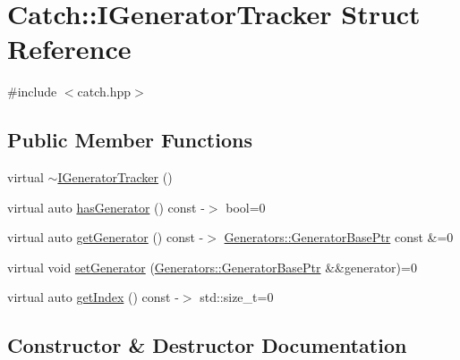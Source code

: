 \hypertarget{struct_catch_1_1_i_generator_tracker}{}\section{Catch\+:\+:I\+Generator\+Tracker Struct Reference}
\label{struct_catch_1_1_i_generator_tracker}


{\ttfamily \#include $<$catch.\+hpp$>$}

\subsection*{Public Member Functions}
\begin{DoxyCompactItemize}
\item 
virtual \mbox{\hyperlink{struct_catch_1_1_i_generator_tracker_a20b3c82baa68f821c180d6dac1234eb1}{$\sim$\+I\+Generator\+Tracker}} ()
\item 
virtual auto \mbox{\hyperlink{struct_catch_1_1_i_generator_tracker_ae88084f9af27c8b9a5d5775b9c148498}{has\+Generator}} () const -\/$>$ bool=0
\item 
virtual auto \mbox{\hyperlink{struct_catch_1_1_i_generator_tracker_a23be942fc51672598bfa02c678c3078a}{get\+Generator}} () const -\/$>$ \mbox{\hyperlink{namespace_catch_1_1_generators_a24d632802570d314c18d00a2ea5e33d1}{Generators\+::\+Generator\+Base\+Ptr}} const \&=0
\item 
virtual void \mbox{\hyperlink{struct_catch_1_1_i_generator_tracker_a9945eff42219edc5a7071eebd8b0419e}{set\+Generator}} (\mbox{\hyperlink{namespace_catch_1_1_generators_a24d632802570d314c18d00a2ea5e33d1}{Generators\+::\+Generator\+Base\+Ptr}} \&\&generator)=0
\item 
virtual auto \mbox{\hyperlink{struct_catch_1_1_i_generator_tracker_a2922f0d8bc7a732079eadbda78e30f79}{get\+Index}} () const -\/$>$ std\+::size\+\_\+t=0
\end{DoxyCompactItemize}


\subsection{Constructor \& Destructor Documentation}
\mbox{\label{struct_catch_1_1_i_generator_tracker_a20b3c82baa68f821c180d6dac1234eb1}} 
